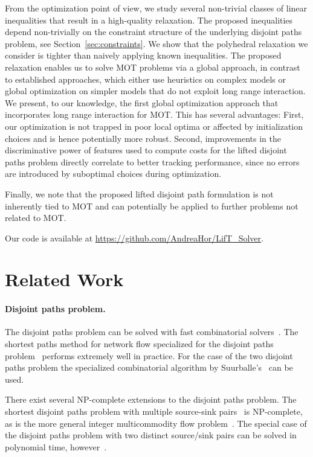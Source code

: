 \documentclass{article}
\begin{document}
From the optimization point of view, we study several non-trivial classes of linear inequalities that result in a high-quality relaxation.
The proposed inequalities depend non-trivially on the constraint structure of the underlying disjoint paths problem, see Section~\ref{sec:constraints}.
We show that the polyhedral relaxation we consider is tighter than naively applying known inequalities.
The proposed relaxation enables us to solve MOT problems via a global approach, in contrast to established approaches, which either use heuristics on complex models or global optimization on simpler models that do not exploit long range interaction.
We present, to our knowledge, the first global optimization approach that incorporates long range interaction for MOT.
This has several advantages:
First, our optimization is not trapped in poor local optima or affected by initialization choices and is hence potentially more robust.
Second, improvements in the discriminative power of features used to compute costs for the lifted disjoint paths problem directly correlate to better tracking performance, since no errors are introduced by suboptimal choices during optimization.


Finally, we note that the proposed lifted disjoint path formulation is not inherently tied to MOT and can potentially be applied to further problems not related to MOT. 

Our code is available at \url{https://github.com/AndreaHor/LifT_Solver}.




  \section{Related Work}



\paragraph{Disjoint paths problem.}
The disjoint paths problem 
can be solved with fast combinatorial solvers~\cite{kovacs2015minimum}. 
The shortest paths method for network flow specialized for the disjoint paths problem~\cite{wang2019mussp} performs extremely well in practice.
For the case of the two disjoint paths problem the specialized combinatorial algorithm by Suurballe's~\cite{suurballe1974disjoint} can be used.


There exist several NP-complete extensions to the disjoint paths problem.
The shortest disjoint paths problem with multiple source-sink pairs~\cite{eilam1998disjoint} is NP-complete, as is the more general integer multicommodity flow problem~\cite{EvenMulti}.
The special case of the disjoint paths problem with two distinct source/sink pairs can be solved in polynomial time, however~\cite{tholey2012linear}.
\end{document}
